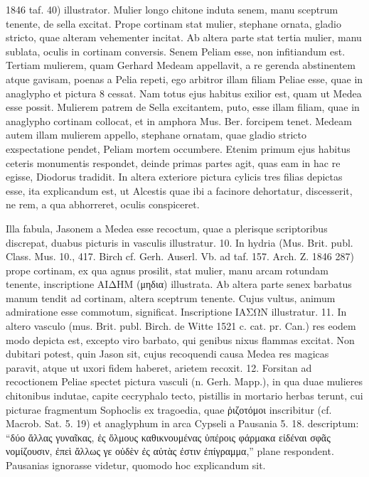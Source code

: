 \documentclass[a4paper, 11pt, oneside, polutonikogreek, german]{article}
\begin{document}
1846 taf. 40) illustrator. Mulier longo chitone induta senem, manu sceptrum tenente, de sella excitat. Prope cortinam stat mulier, stephane ornata, gladio stricto, quae alteram vehementer incitat. Ab altera parte stat tertia mulier, manu sublata, oculis in cortinam conversis. Senem Peliam esse, non infitiandum est. Tertiam mulierem, quam Gerhard Medeam appellavit, a re gerenda abstinentem atque gavisam, poenas a Pelia repeti, ego arbitror illam filiam Peliae esse, quae in anaglypho et pictura 8 cessat. Nam totus ejus habitus exilior est, quam ut Medea esse possit. Mulierem patrem de Sella excitantem, puto, esse illam filiam, quae in anaglypho cortinam collocat, et in amphora Mus. Ber. forcipem tenet. Medeam autem illam mulierem appello, stephane ornatam, quae gladio stricto exspectatione pendet, Peliam mortem occumbere. Etenim primum ejus habitus ceteris monumentis respondet, deinde primas partes agit, quas eam in hac re egisse, Diodorus tradidit. In altera exteriore pictura cylicis tres filias depictas esse, ita explicandum est, ut Alcestis quae ibi a facinore dehortatur, discesserit, ne rem, a qua abhorreret, oculis conspiceret.

Illa fabula, Jasonem a Medea esse recoctum, quae a plerisque scriptoribus discrepat, duabus picturis in vasculis illustratur. 10. In hydria (Mus. Brit. publ. Class. Mus. 10., 417. Birch cf. Gerh. Auserl. Vb. ad taf. 157. Arch. Z. 1846 287) prope cortinam, ex qua agnus prosilit, stat mulier, manu arcam rotundam tenente, inscriptione ΑΙΔΗΜ (μηδια) illustrata. Ab altera parte senex barbatus manum tendit ad cortinam, altera sceptrum tenente. Cujus vultus, animum admiratione esse commotum, significat. Inscriptione ΙΑΣΩΝ illustratur. 11. In altero vasculo (mus. Brit. publ. Birch. de Witte 1521 c. cat. pr. Can.) res eodem modo depicta est, excepto viro barbato, qui genibus nixus flammas excitat. Non dubitari potest, quin Jason sit, cujus recoquendi causa Medea res magicas paravit, atque ut uxori fidem haberet, arietem recoxit. 12. Forsitan ad recoctionem Peliae spectet pictura vasculi (n. Gerh. Mapp.), in qua duae mulieres chitonibus indutae, capite cecryphalo tecto, pistillis in mortario herbas terunt, cui picturae fragmentum Sophoclis ex tragoedia, quae ῥιζοτόμοι inscribitur (cf. Macrob. Sat. 5. 19) et anaglyphum in arca Cypseli a Pausania 5. 18. descriptum: "`δύο ἄλλας γυναῖκας, ἐς ὅλμους καθικνουμένας ὑπέροις φάρμακα εἰδέναι σφᾶς νομίζουσιν, ἐπεὶ ἄλλως γε οὐδὲν ἐς αὐτὰς ἐστιν ἐπίγραμμα,"' plane respondent. Pausanias ignorasse videtur, quomodo hoc explicandum sit.
\end{document}
